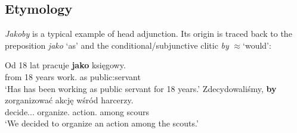 \documentclass[output=paper
,modfonts
,nonflat]{langsci/langscibook}
\begin{document}
\subsection{Etymology}

\emph{Jakoby} is a typical example of head adjunction. Its origin is traced back to the preposition \emph{jako} `as' and the conditional\slash subjunctive clitic \emph{by} $\approx$`would':

\ea \ea \gll	Od 18 lat pracuje \textbf{jako} księgowy. \\
		from 18 years work.{\thirdperson}{\sg} as {public:servant} \\
		\glt	`Has has been working as public servant for 18 years.' 
		\ex\gll		Zdecydowaliśmy, \textbf{by} zorganizować akcję wśród harcerzy. \label{pasek} \\
	            decide.{\lptcp}.{\vir}.{\firstperson}{\pl} {\subj} organize.{\infv} action.{\acc} among scours \\
		\glt	 `We decided to organize an action among the scouts.' 
    \z\z
\end{document}
